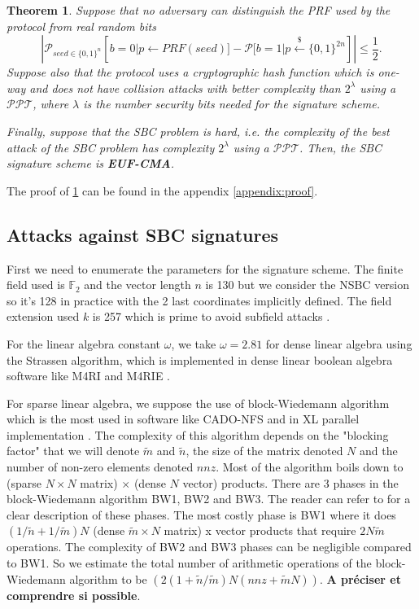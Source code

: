 \documentclass[english]{article}
\newtheorem{theorem}{Theorem}[section]
\begin{document}
		\begin{theorem}\label{EUF-CMA}
			Suppose that no adversary can distinguish the PRF used by the protocol from real random bits
			$$
				| \mathcal{P}_{seed \in \{0,1\}^n}[b=0 | p \leftarrow PRF(seed)] - \mathcal{P}[b=1 | p \overset{{\scriptscriptstyle\$}}{\leftarrow} \{0,1\}^{2n}] | \leq \frac{1}{2}.
			$$
			Suppose also that the protocol uses a cryptographic hash function which is one-way and does not have collision attacks with better complexity than $2^{\lambda}$ using a $\mathcal{PPT}$, where $\lambda$ is the number security bits needed for the signature scheme.
			
			Finally, suppose that the SBC problem is hard, i.e. the complexity of the best attack of the SBC problem has complexity $2^{\lambda}$ using a $\mathcal{PPT}$.
			Then, the SBC signature scheme is \textbf{EUF-CMA}.
		\end{theorem}
		The proof of \ref{EUF-CMA} can be found in the appendix \ref{appendix:proof}.
		
		\subsection{Attacks against SBC signatures}
		First we need to enumerate the parameters for the signature scheme. The finite field used is $\mathbb{F}_2$ and the vector length $n$ is 130 but we consider the NSBC version so it's 128 in practice with the 2 last coordinates implicitly defined. The field extension used $k$ is 257 which is prime to avoid subfield attacks \cite{Peb24}.
		
		For the linear algebra constant $\omega$, we take $\omega = 2.81$ for dense linear algebra using the Strassen algorithm, which is implemented in dense linear boolean algebra software like M4RI and M4RIE \cite{M4RI}.
		
		For sparse linear algebra, we suppose the use of block-Wiedemann algorithm which is the most used in software like CADO-NFS \cite{cadonfs} and in XL parallel implementation \cite{NNY17}. The complexity of this algorithm depends on the "blocking factor" that we will denote $\tilde{m}$ and $\tilde{n}$, the size of the matrix denoted $N$ and the number of non-zero elements denoted $nnz$. Most of the algorithm boils down to (sparse $N \times N$ matrix) $\times$ (dense $N$ vector) products. There are 3 phases in the block-Wiedemann algorithm BW1, BW2 and BW3. The reader can refer to \cite{NNY17} for a clear description of these phases. The most costly phase is BW1 where it does $(1/\tilde{n} + 1/\tilde{m})N$ (dense $\tilde{m} \times N$ matrix) x vector products that require $2N\tilde{m}$ operations. The complexity of BW2 and BW3 phases can be negligible compared to BW1. So we estimate the total number of arithmetic operations of the block-Wiedemann algorithm to be $(2(1 + \tilde{n}/\tilde{m})N(nnz + \tilde{m}N))$. \textbf{A préciser et comprendre si possible}.
		
\end{document}
